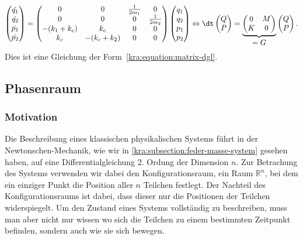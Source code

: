 \begin{equation}
    \label{kra:equation:hamilton-multispringmass}
    \begin{pmatrix}
        \dot{q_1} \\
        \dot{q_2} \\
        \dot{p_1} \\
        \dot{p_2} \\
    \end{pmatrix}
    =
    \begin{pmatrix}
        0            & 0            & \frac{1}{2m_1} & 0              \\
        0            & 0            & 0              & \frac{1}{2m_2} \\
        -(k_1 + k_c) & k_c          & 0              & 0              \\
        k_c          & -(k_c + k_2) & 0              & 0              \\
    \end{pmatrix}
    \begin{pmatrix}
        q_1 \\
        q_2 \\
        p_1 \\
        p_2 \\
    \end{pmatrix}
    \Leftrightarrow
    \dt
    \begin{pmatrix}
        Q \\
        P \\
    \end{pmatrix}
    =
    \underbrace{
        \begin{pmatrix}
            0 & M \\
            K & 0
        \end{pmatrix}
    }_{\displaystyle = G}
    \begin{pmatrix}
        Q \\
        P \\
    \end{pmatrix}.
\end{equation}
Dies ist eine Gleichung der Form~\eqref{kra:equation:matrix-dgl}.

\subsection{Phasenraum}
\subsubsection{Motivation}
Die Beschreibung eines klassischen physikalischen Systems führt in der Newtonschen-Mechanik, wie wir in \ref{kra:subsection:feder-masse-system} gesehen haben, auf eine Differentialgleichung 2. Ordung der Dimension $n$.
Zur Betrachung des Systems verwenden wir dabei den Konfigurationsraum, ein Raum $\mathbb{R}^n$, bei dem ein einziger Punkt die Position aller $n$ Teilchen festlegt.
Der Nachteil des Konfigurationsraums ist dabei, dass dieser nur die Positionen der Teilchen widerspiegelt.
Um den Zustand eines Systems vollständig zu beschreiben, muss man aber nicht nur wissen wo sich die Teilchen zu einem bestimmten Zeitpunkt befinden, sondern auch wie sie sich bewegen.

